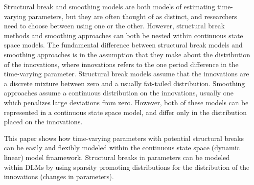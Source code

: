\documentclass{article}
\begin{document}
\begin{itemize}
Structural break and smoothing models are both models of estimating time-varying parameters, but they are often thought of as distinct, and researchers need to choose between using one or the other.
However, structural break methods and smoothing approaches can both be nested within continuous state space models.
The fundamental difference between structural break models and smoothing approaches is in the assumption that they make about the distribution of the innovations, where innovations refers to the one period difference in the time-varying parameter.
Structural break models assume that the innovations are a discrete mixture between zero and a usually fat-tailed distribution.
Smoothing approaches assume a continuous distribution on the innovations, usually one which penalizes large deviations from zero.
However, both of these models can be represented in a continuous state space model, and differ only in the distribution placed on the innovations.

This paper shows how time-varying parameters with potential structural breaks can be easily and flexibly modeled within the continuous state space (dynamic linear) model fraamework.
Structural breaks in parameters can be modeled within DLMs by using sparsity promoting distributions for the distribution of the innovations (changes in parameters).


\end{itemize}
\end{document}
